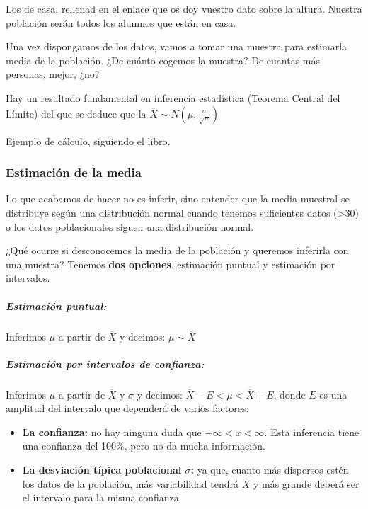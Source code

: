 \begin{example}
Los de casa, rellenad en el enlace que os doy vuestro dato sobre la altura. Nuestra población serán todos los alumnos que están en casa. 

Una vez dispongamos de los datos, vamos a tomar una muestra para estimarla media de la población. ¿De cuánto cogemos la muestra? De cuantas más personas, mejor, ¿no?

 Hay un resultado fundamental en inferencia estadística (Teorema Central del Límite) del que se deduce que la  $\overline{X} \sim N\left(\mu,\frac{\sigma}{\sqrt{n}}\right)$
\end{example}

\begin{example}
Ejemplo de cálculo, siguiendo el libro.
\end{example}

\subsubsection{Estimación de la media}
Lo que acabamos de hacer no es inferir, sino entender que la media muestral se distribuye según una distribución normal cuando tenemos suficientes datos (>30) o los datos poblacionales siguen una distribución normal. 

¿Qué ocurre si desconocemos la media de la población y queremos inferirla con una muestra?
%
Tenemos \textbf{dos opciones}, estimación puntual y estimación por intervalos.

\subparagraph{Estimación puntual: } Inferimos $\mu$ a partir de $\overline{X}$ y decimos: $\mu \sim \overline{X}$

\subparagraph{Estimación por intervalos de confianza: } Inferimos $\mu$ a partir de $\overline{X}$ y $\sigma$ y decimos: $\overline{X} - E < \mu < \overline{X} + E$, donde $E$ es una amplitud del intervalo que dependerá de varios factores:
\begin{itemize}
    \item \textbf{La confianza:} no hay ninguna duda que $-\infty<x<\infty$. Esta inferencia tiene una confianza del 100\%, pero no da mucha información. 
    \item \textbf{La desviación típica poblacional $\sigma$:} ya que, cuanto más dispersos estén los datos de la población, más variabilidad tendrá $\overline{X}$ y más grande deberá ser el intervalo para la misma confianza.
\end{itemize}


